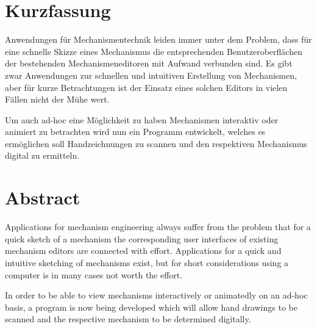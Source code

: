 \section*{Kurzfassung}
Anwendungen für Mechanismentechnik leiden immer unter dem Problem, dass für eine schnelle Skizze eines Mechanismus die entsprechenden Benutzeroberflächen der bestehenden Mechanismeneditoren mit Aufwand verbunden sind. Es gibt zwar Anwendungen zur schnellen und intuitiven Erstellung von Mechanismen, aber für kurze Betrachtungen ist der Einsatz eines solchen Editors in vielen Fällen nicht der Mühe wert.

Um auch ad-hoc eine Möglichkeit zu haben Mechanismen interaktiv oder animiert zu betrachten wird nun ein Programm entwickelt, welches es ermöglichen soll Handzeichnungen zu scannen und den respektiven Mechanismus digital zu ermitteln.

\section*{Abstract}
Applications for mechanism engineering always suffer from the problem that for a quick sketch of a mechanism the corresponding user interfaces of existing mechanism editors are connected with effort.
Applications for a quick and intuitive sketching of mechanisms exist, but for short considerations using a computer is in many cases not worth the effort.

In order to be able to view mechanisms interactively or animatedly on an ad-hoc basis, a program is now being developed which will allow hand drawings to be scanned and the respective mechanism to be determined digitally.
